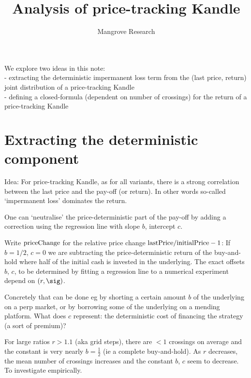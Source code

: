 \documentclass[oneside,12pt]{article}
\title{Analysis of price-tracking Kandle}
\author{Mangrove Research}
\begin{document}
\maketitle
We explore two ideas in this note:
\\- extracting the deterministic impermanent loss term from the 
(last price, return) joint distribution of a price-tracking Kandle
\\- defining a closed-formula (dependent on number of crossings) for
the return of a price-tracking Kandle

\section{Extracting the deterministic component}
Idea: 
For price-tracking Kandle, as for all variants,
there is a strong correlation between the last price and the pay-off (or return).
In other words so-called `impermanent loss' dominates the return.

One can `neutralise' the price-deterministic part of the pay-off by adding 
a correction using the regression line with slope $b$, intercept $c$. 

Write $\hbox{priceChange}$ for the relative price change
$\hbox{lastPrice}/\hbox{initialPrice} - 1$:
If $b=1/2$, $c=0$ we are subtracting the price-deterministic return of the buy-and-hold
where half of the initial cash is invested in the underlying.
The exact offsets $b$, $c$, to be determined by fitting a regression line
to a numerical experiment depend on $(r,\sig)$.

Concretely that can be done eg by shorting a certain amount $b$ of the underlying on a perp market,
or by borrowing some of the underlying on a mending platform. What does $c$ represent: 
the deterministic cost of financing the strategy (a sort of premium)?

For large ratios $r>1.1$ (aka grid steps), 
there are $<1$ crossings on average and the constant is very nearly $b=\frac12$ (ie a complete buy-and-hold).
As $r$ decreases, the mean number of crossings increases and the constant $b$, $c$ seem to decrease.
To investigate empirically.
\end{document}
